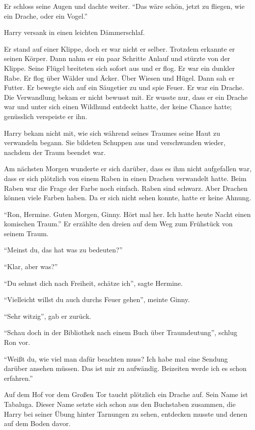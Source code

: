  Er schloss seine Augen und dachte weiter. \enquote{Das wäre schön, jetzt zu fliegen, wie ein Drache, oder ein Vogel.}

Harry versank in einen leichten Dämmerschlaf.

\begin{traum}
Er stand auf einer Klippe, doch er war nicht er selber. Trotzdem erkannte er seinen Körper. Dann nahm er ein paar Schritte Anlauf und stürzte von der Klippe. Seine Flügel breiteten sich sofort aus und er flog. Er war ein dunkler Rabe. Er flog über Wälder und Äcker. Über Wiesen und Hügel. Dann sah er Futter. Er bewegte sich auf ein Säugetier zu und spie Feuer. Er war ein Drache. Die Verwandlung bekam er nicht bewusst mit. Er wusste nur, dass er ein Drache war und unter sich einen Wildhund entdeckt hatte, der keine Chance hatte; genüsslich verspeiste er ihn.
\end{traum}

Harry bekam nicht mit, wie sich während seines Traumes seine Haut zu verwandeln begann. Sie bildeten Schuppen aus und verschwanden wieder, nachdem der Traum beendet war.

Am nächsten Morgen wunderte er sich darüber, dass es ihm nicht aufgefallen war, dass er sich plötzlich von einem Raben in einen Drachen verwandelt hatte. Beim Raben war die Frage der Farbe noch einfach. Raben sind schwarz. Aber Drachen können viele Farben haben. Da er sich nicht sehen konnte, hatte er keine Ahnung.

\enquote{Ron, Hermine. Guten Morgen, Ginny. Hört mal her. Ich hatte heute Nacht einen komischen Traum.} Er erzählte den dreien auf dem Weg zum Frühstück von seinem Traum.

\enquote{Meinst du, das hat was zu bedeuten?}

\enquote{Klar, aber was?}

\enquote{Du sehnst dich nach Freiheit, schätze ich}, sagte Hermine.

\enquote{Vielleicht willst du auch durchs Feuer gehen}, meinte Ginny.

\enquote{Sehr witzig}, gab er zurück.

\enquote{Schau doch in der Bibliothek nach einem Buch über Traumdeutung}, schlug Ron vor.

\enquote{Weißt du, wie viel man dafür beachten muss? Ich habe mal eine Sendung darüber ansehen müssen. Das ist mir zu aufwändig. Beizeiten werde ich es schon erfahren.}




\begin{kommentar}
Auf dem Hof vor dem Großen Tor taucht plötzlich ein Drache auf. Sein Name ist Tabaluga. Dieser Name setzte sich schon aus den Buchstaben zusammen, die Harry bei seiner Übung hinter Tarnungen zu sehen, entdecken musste und denen auf dem Boden davor.
\end{kommentar}
